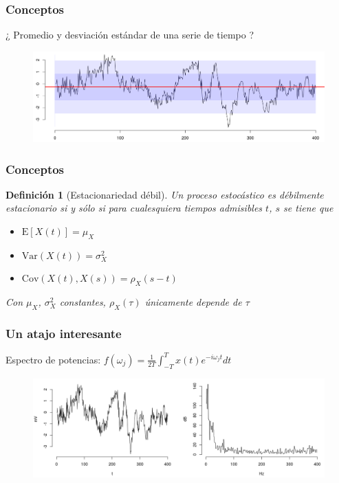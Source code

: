 \documentclass[11pt]{beamer}
\newtheorem{defn}{Definición}
\newcommand{\simint}[1]{\int_{- #1 }^{ #1 }}
\newcommand{\E}[1]{\mathrm{E}\left[ #1 \right]}
\newcommand{\Var}[1]{\mathrm{Var}\left( #1 \right)}
\newcommand{\Cov}[1]{\mathrm{Cov}\left( #1 \right)}
\begin{document}

\begin{frame}\frametitle{Conceptos}
¿ Promedio y desviación estándar de una serie de tiempo ?
\begin{figure}
\centering
\includegraphics[width=\linewidth]{./curso_scripts/serie_mu.png}
\end{figure}
\end{frame}


\begin{frame}\frametitle{Conceptos}
\begin{defn}[Estacionariedad débil]
Un proceso estocástico es débilmente estacionario si y sólo si para cualesquiera tiempos 
admisibles $t$, $s$ se tiene que
\begin{itemize}
\item $\E{X(t)} = \mu_X$
\item $\Var{X(t)} = \sigma^{2}_X$
\item $\Cov{X(t),X(s)} = \rho_X (s-t)$
\end{itemize}
Con $\mu_X$, $\sigma^{2}_X$ constantes, $\rho_X(\tau)$ únicamente depende de $\tau$
\end{defn}
\end{frame}


\begin{frame}\frametitle{Un atajo interesante}
Espectro de potencias: 
$f(\omega_j) = \frac{1}{2 T} \simint{T} x(t) e^{-i \omega_j t} dt$
\begin{figure}
\centering
\includegraphics[width=\linewidth]{./curso_scripts/spec.png}
\end{figure}
\end{frame}
\end{document}
